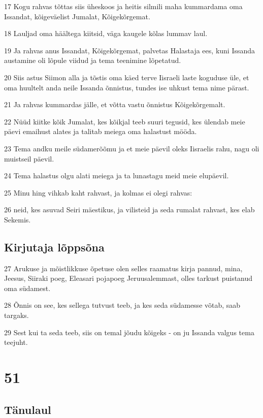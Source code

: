 \par 17 Kogu rahvas tõttas siis üheskoos ja heitis silmili maha kummardama oma Issandat, kõigeväelist Jumalat, Kõigekõrgemat.
\par 18 Lauljad oma häältega kiitsid, väga kaugele kõlas lummav laul.
\par 19 Ja rahvas anus Issandat, Kõigekõrgemat, palvetas Halastaja ees, kuni Issanda austamine oli lõpule viidud ja tema teenimine lõpetatud.
\par 20 Siis astus Siimon alla ja tõstis oma käed terve Iisraeli laste koguduse üle, et oma huultelt anda neile Issanda õnnistus, tundes ise uhkust tema nime pärast.
\par 21 Ja rahvas kummardas jälle, et võtta vastu õnnistus Kõigekõrgemalt.
\par 22 Nüüd kiitke kõik Jumalat, kes kõikjal teeb suuri tegusid, kes ülendab meie päevi emaihust alates ja talitab meiega oma halastust mööda.
\par 23 Tema andku meile südamerõõmu ja et meie päevil oleks Iisraelis rahu, nagu oli muistseil päevil.
\par 24 Tema halastus olgu alati meiega ja ta lunastagu meid meie elupäevil.
\par 25 Minu hing vihkab kaht rahvast, ja kolmas ei olegi rahvas:
\par 26 neid, kes asuvad Seiri mäestikus, ja vilisteid ja seda rumalat rahvast, kes elab Sekemis.

\section*{Kirjutaja lõppsõna}

\par 27 Arukuse ja mõistlikkuse õpetuse olen selles raamatus kirja pannud, mina, Jeesus, Siiraki poeg, Eleasari pojapoeg Jeruusalemmast, olles tarkust puistanud oma südamest.
\par 28 Õnnis on see, kes sellega tutvust teeb, ja kes seda südamesse võtab, saab targaks.
\par 29 Sest kui ta seda teeb, siis on temal jõudu kõigeks - on ju Issanda valgus tema teejuht.

\chapter{51}

\section*{Tänulaul}

